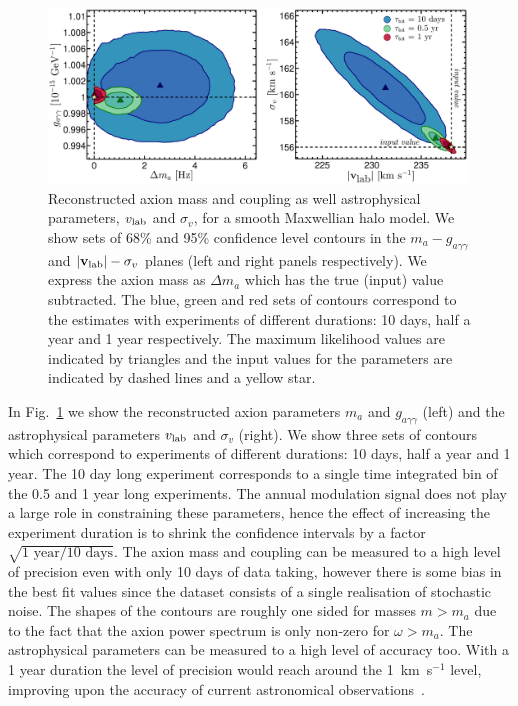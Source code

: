 \begin{figure}
\begin{center}
	\includegraphics[width=0.99\textwidth]{Figures/axion_bench_recon.eps}
    \caption[Reconstructed axion mass, coupling and astrophysical parameters]{Reconstructed axion mass and coupling as well astrophysical parameters, $v_{\rm lab}$ and $\sigma_v$, for a smooth Maxwellian halo model. We show sets of 68\% and 95\% confidence level contours in the $m_a - g_{a\gamma\gamma}$ and $|\textbf{v}_{\rm lab}|-\sigma_v$ planes (left and right panels respectively). We express the axion mass as $\Delta m_a$ which has the true (input) value subtracted. The blue, green and red sets of contours correspond to the estimates with experiments of different durations: 10 days, half a year and 1 year respectively. The maximum likelihood values are indicated by triangles and the input values for the parameters are indicated by dashed lines and a yellow star.}\label{fig:axion_bench_recon}
\end{center}
\end{figure}
In Fig.~\ref{fig:axion_bench_recon} we show the reconstructed axion parameters $m_a$ and $g_{a\gamma\gamma}$ (left) and the astrophysical parameters $v_{\rm lab}$ and $\sigma_v$ (right). We show three sets of contours which correspond to experiments of different durations: 10 days, half a year and 1 year. The 10 day long experiment corresponds to a single time integrated bin of the 0.5 and 1 year long experiments. The annual modulation signal does not play a large role in constraining these parameters, hence the effect of increasing the experiment duration is to shrink the confidence intervals by a factor $\sqrt{\textrm{1 year}/\textrm{10 days}}$.  The axion mass and coupling can be measured to a high level of precision even with only 10 days of data taking, however there is some bias in the best fit values since the dataset consists of a single realisation of stochastic noise. The shapes of the contours are roughly one sided for masses $m>m_a$ due to the fact that the axion power spectrum is only non-zero for $\omega>m_a$. The astrophysical parameters can be measured to a high level of accuracy too. With a 1 year duration the level of precision would reach around the 1~km~s$^{-1}$ level, improving upon the accuracy of current astronomical observations~\cite{McMillan:2009yr}.

